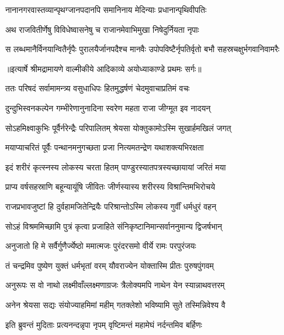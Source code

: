 \twolineshloka
{नानानगरवास्तव्यान्पृथग्जानपदानपि}
{समानिनाय मेदिन्याः प्रधानान्पृथिवीपतिः} %

\twolineshloka
{अथ राजवितीर्णेषु विविधेष्वासनेषु च}
{राजानमेवाभिमुखा निषेदुर्नियता नृपाः} %

\fourlineindentedshloka
{स लब्धमानैर्विनयान्वितैर्नृपैः}
{ पुरालयैर्जानपदैश्च मानवैः}
{उपोपविष्टैर्नृपतिर्वृतो बभौ}
{ सहस्रचक्षुर्भगवानिवामरैः} %


{॥इत्यार्षे श्रीमद्रामायणे वाल्मीकीये आदिकाव्ये अयोध्याकाण्डे प्रथमः सर्गः॥}


\twolineshloka
{ततः परिषदं सर्वामामन्त्र्य वसुधाधिपः}
{हितमुद्धर्षणं चेदमुवाचाप्रतिमं वचः} %

\twolineshloka
{दुन्दुभिस्वनकल्पेन गम्भीरेणानुनादिना}
{स्वरेण महता राजा जीग्मूत इव नादयन्} %

\twolineshloka
{सोऽहमिक्ष्वाकुभिः पूर्वैर्नरेन्द्रैः परिपालितम्}
{श्रेयसा योक्तुकामोऽस्मि सुखार्हमखिलं जगत्} %

\twolineshloka
{मयाप्याचरितं पूर्वैः पन्थानमनुगच्छता}
{प्रजा नित्यमतन्द्रेण यथाशक्त्यभिरक्षता} %

\twolineshloka
{इदं शरीरं कृत्स्नस्य लोकस्य चरता हितम्}
{पाण्डुरस्यातपत्रस्यच्छायायां जरितं मया} %

\twolineshloka
{प्राप्य वर्षसहस्राणि बहून्यायूंषि जीवितः}
{जीर्णस्यास्य शरीरस्य विश्रान्तिमभिरोचये} %

\twolineshloka
{राजप्रभावजुष्टां हि दुर्वहामजितेन्द्रियैः}
{परिश्रान्तोऽस्मि लोकस्य गुर्वीं धर्मधुरं वहन्} %

\twolineshloka
{सोऽहं विश्रममिच्छामि पुत्रं कृत्वा प्रजाहिते}
{संनिकृष्टानिमान्सर्वाननुमान्य द्विजर्षभान्} %

\twolineshloka
{अनुजातो हि मे सर्वैर्गुणैर्ज्येष्ठो ममात्मजः}
{पुरंदरसमो वीर्ये रामः परपुरंजयः} %

\twolineshloka
{तं चन्द्रमिव पुष्येण युक्तं धर्मभृतां वरम्}
{यौवराज्येन योक्तास्मि प्रीतः पुरुषपुंगवम्} %

\twolineshloka
{अनुरूपः स वो नाथो लक्ष्मीवाँल्लक्ष्मणाग्रजः}
{त्रैलोक्यमपि नाथेन येन स्यान्नाथवत्तरम्} %

\twolineshloka
{अनेन श्रेयसा सद्यः संयोज्याहमिमां महीम्}
{गतक्लेशो भविष्यामि सुते तस्मिन्निवेश्य वै} %

\twolineshloka
{इति ब्रुवन्तं मुदिताः प्रत्यनन्दन्नृपा नृपम्}
{वृष्टिमन्तं महामेघं नर्दन्तमिव बर्हिणः} %

